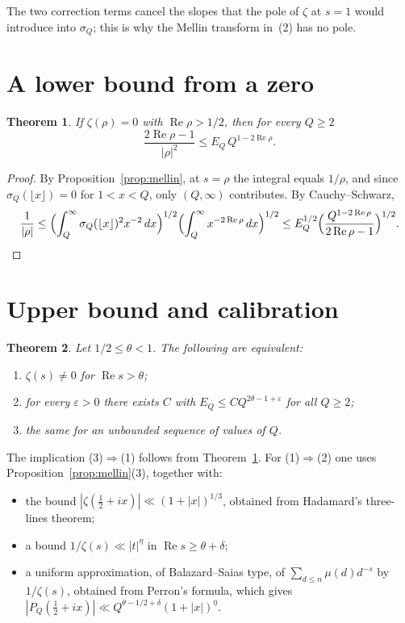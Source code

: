 \documentclass[11pt,a4paper]{amsart}
\newtheorem{theorem}{Theorem}
\theoremstyle{definition}
\theoremstyle{remark}
\renewcommand{\Re}{\operatorname{Re}}
\begin{document}
The two correction terms cancel the slopes that the pole of $\zeta$ at $s=1$ would introduce into $\sigma_Q$; this is why the Mellin transform in~(2) has no pole.

\section{A lower bound from a zero}

\begin{theorem}\label{teo:recip}
If $\zeta(\rho)=0$ with $\Re\rho>1/2$, then for every $Q\ge2$
\[
\frac{2\Re\rho-1}{|\rho|^2}\le E_Q\,Q^{1-2\Re\rho}.
\]
\end{theorem}

\begin{proof}
By Proposition~\ref{prop:mellin}, at $s=\rho$ the integral equals $1/\rho$, and since $\sigma_Q(\lfloor x\rfloor)=0$ for $1<x<Q$, only $(Q,\infty)$ contributes. By Cauchy--Schwarz,
\[
\frac1{|\rho|}\le\Bigl(\int_Q^\infty\sigma_Q(\lfloor x\rfloor)^2x^{-2}\,dx\Bigr)^{1/2}\Bigl(\int_Q^\infty x^{-2\Re\rho}\,dx\Bigr)^{1/2}
\le E_Q^{1/2}\Bigl(\frac{Q^{1-2\Re\rho}}{2\Re\rho-1}\Bigr)^{1/2}.\qedhere
\]
\end{proof}

\section{Upper bound and calibration}\label{sec:cotas}

\begin{theorem}\label{teo:theta}
Let $1/2\le\theta<1$. The following are equivalent:
\begin{enumerate}
\item $\zeta(s)\ne0$ for $\Re s>\theta$;
\item for every $\varepsilon>0$ there exists $C$ with $E_Q\le CQ^{2\theta-1+\varepsilon}$ for all $Q\ge2$;
\item the same for an unbounded sequence of values of $Q$.
\end{enumerate}
\end{theorem}

The implication (3)$\Rightarrow$(1) follows from Theorem~\ref{teo:recip}. For (1)$\Rightarrow$(2) one uses Proposition~\ref{prop:mellin}(3), together with:
\begin{itemize}
\item the bound $|\zeta(\tfrac12+ix)|\ll(1+|x|)^{1/3}$, obtained from Hadamard's three-lines theorem;
\item a bound $1/\zeta(s)\ll|t|^\eta$ in $\Re s\ge\theta+\delta$;
\item a uniform approximation, of Balazard--Saias type, of $\sum_{d\le n}\mu(d)d^{-s}$ by $1/\zeta(s)$, obtained from Perron's formula, which gives $|P_Q(\tfrac12+ix)|\ll Q^{\theta-1/2+\delta}(1+|x|)^\eta$.
\end{itemize}
\end{document}

